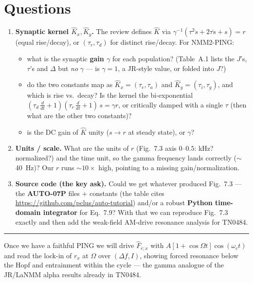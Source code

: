 \documentclass[11pt,a4paper]{article}
\begin{document}
\section{Questions}
\begin{enumerate}[label=\textbf{Q\arabic*.}]
\item \textbf{Synaptic kernel $\hat K_x,\hat K_y$.} The review defines $\hat K$ via
      $\gamma^{-1}\!\left(\tau^2\ddot s+2\tau\dot s+s\right)=r$ (equal rise/decay), or
      $(\tau_r,\tau_d)$ for distinct rise/decay. For NMM2-PING:
      \begin{itemize}
      \item what is the synaptic \textbf{gain $\gamma$} for each population? (Table~A.1
            lists the $J$'s, $\tau$'s and $\Delta$ but \emph{no} $\gamma$ --- is
            $\gamma=1$, a JR-style value, or folded into $J$?)
      \item do the two constants map as $\hat K_x=(\tau_e,\tau_a)$ and
            $\hat K_y=(\tau_i,\tau_g)$, and which is rise vs.\ decay? Is the kernel the
            bi-exponential $(\tau_d\,\tfrac{d}{dt}+1)(\tau_r\,\tfrac{d}{dt}+1)\,s=\gamma r$,
            or critically damped with a single $\tau$ (then what are the other two
            constants)?
      \item is the DC gain of $\hat K$ unity ($s\!\to\!r$ at steady state), or $\gamma$?
      \end{itemize}
\item \textbf{Units / scale.} What are the units of $r$ (Fig.~7.3 axis $0$--$0.5$: kHz?
      normalized?) and the time unit, so the gamma frequency lands correctly
      ($\sim$40~Hz)? Our $r$ runs $\sim$$10\times$ high, pointing to a missing
      gain/normalization.
\item \textbf{Source code (the key ask).} Could we get whatever produced Fig.~7.3 --- the
      \textbf{AUTO-07P} files + constants (the table cites
      \url{https://github.com/pclus/auto-tutorial}) and/or a robust \textbf{Python
      time-domain integrator} for Eq.~7.9? With that we can reproduce Fig.~7.3 exactly and
      then add the weak-field AM-drive resonance analysis for TN0484.
\end{enumerate}

\medskip
\hrule
\medskip
\noindent\footnotesize Once we have a faithful PING we will drive $\hat F_{e;x}$ with
$A[1+\cos\Omega t]\cos(\omega_c t)$ and read the lock-in of $r_x$ at $\Omega$ over
$(\Delta f, I)$, showing forced resonance below the Hopf and entrainment within the cycle
--- the gamma analogue of the JR/LaNMM alpha results already in TN0484.
\end{document}
